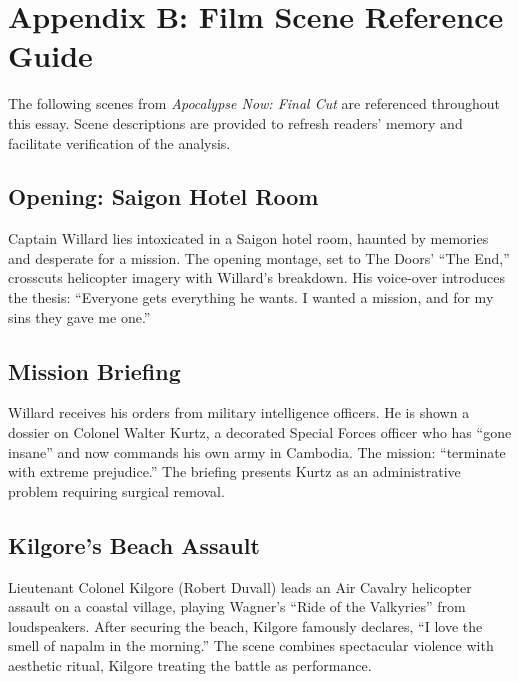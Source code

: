 \section*{Appendix B: Film Scene Reference Guide}
\label{app:scene-reference}

The following scenes from \textit{Apocalypse Now: Final Cut} \parencite{CoppolaApocalypse2019}
are referenced throughout this essay. Scene descriptions are provided to refresh readers'
memory and facilitate verification of the analysis.

\subsection*{Opening: Saigon Hotel Room}
\label{scene:saigon-opening}

Captain Willard lies intoxicated in a Saigon hotel room, haunted by memories and desperate for
a mission. The opening montage, set to The Doors' ``The End,'' crosscuts helicopter imagery
with Willard's breakdown. His voice-over introduces the thesis: ``Everyone gets everything he
wants. I wanted a mission, and for my sins they gave me one.''

\subsection*{Mission Briefing}
\label{scene:briefing}

Willard receives his orders from military intelligence officers. He is shown a dossier on
Colonel Walter Kurtz, a decorated Special Forces officer who has ``gone insane'' and now
commands his own army in Cambodia. The mission: ``terminate with extreme prejudice.'' The
briefing presents Kurtz as an administrative problem requiring surgical removal.

\subsection*{Kilgore's Beach Assault}
\label{scene:kilgore-beach}

Lieutenant Colonel Kilgore (Robert Duvall) leads an Air Cavalry helicopter assault on a coastal
village, playing Wagner's ``Ride of the Valkyries'' from loudspeakers. After securing the
beach, Kilgore famously declares, ``I love the smell of napalm in the morning.'' The scene
combines spectacular violence with aesthetic ritual, Kilgore treating the battle as
performance.


